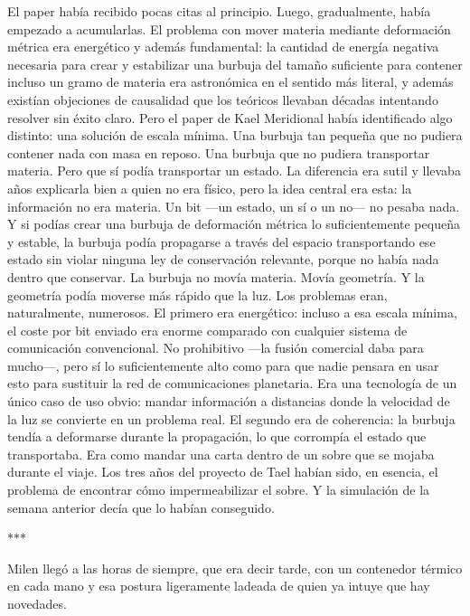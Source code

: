 \documentclass[11pt,a5paper,twoside]{book}
\begin{document}
El paper había recibido pocas citas al principio. Luego, gradualmente, había empezado a acumularlas.
El problema con mover materia mediante deformación métrica era energético y además fundamental: la cantidad de energía negativa necesaria para crear y estabilizar una burbuja del tamaño suficiente para contener incluso un gramo de materia era astronómica en el sentido más literal, y además existían objeciones de causalidad que los teóricos llevaban décadas intentando resolver sin éxito claro. Pero el paper de Kael Meridional había identificado algo distinto: una solución de escala mínima. Una burbuja tan pequeña que no pudiera contener nada con masa en reposo. Una burbuja que no pudiera transportar materia.
Pero que sí podía transportar un estado.
La diferencia era sutil y llevaba años explicarla bien a quien no era físico, pero la idea central era esta: la información no era materia. Un bit —un estado, un sí o un no— no pesaba nada. Y si podías crear una burbuja de deformación métrica lo suficientemente pequeña y estable, la burbuja podía propagarse a través del espacio transportando ese estado sin violar ninguna ley de conservación relevante, porque no había nada dentro que conservar. La burbuja no movía materia. Movía geometría.
Y la geometría podía moverse más rápido que la luz.
Los problemas eran, naturalmente, numerosos.
El primero era energético: incluso a esa escala mínima, el coste por bit enviado era enorme comparado con cualquier sistema de comunicación convencional. No prohibitivo —la fusión comercial daba para mucho—, pero sí lo suficientemente alto como para que nadie pensara en usar esto para sustituir la red de comunicaciones planetaria. Era una tecnología de un único caso de uso obvio: mandar información a distancias donde la velocidad de la luz se convierte en un problema real.
El segundo era de coherencia: la burbuja tendía a deformarse durante la propagación, lo que corrompía el estado que transportaba. Era como mandar una carta dentro de un sobre que se mojaba durante el viaje. Los tres años del proyecto de Tael habían sido, en esencia, el problema de encontrar cómo impermeabilizar el sobre.
Y la simulación de la semana anterior decía que lo habían conseguido.
\vspace{1.5em}
\begin{center}$\ast$\quad$\ast$\quad$\ast$\end{center}
\vspace{1.5em}
Milen llegó a las horas de siempre, que era decir tarde, con un contenedor térmico en cada mano y esa postura ligeramente ladeada de quien ya intuye que hay novedades.
\end{document}

